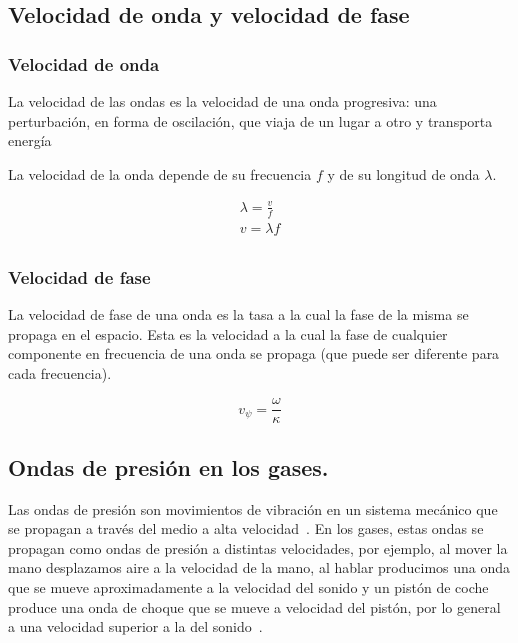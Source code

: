 \documentclass[twocolumn, 12pt]{article}
\begin{document}
\subsection{Velocidad de onda y velocidad de fase}

\subsubsection*{Velocidad de onda~\cite{Velocidaddeonda}}

La velocidad de las ondas es la velocidad de una onda
progresiva: una perturbación, en forma de oscilación, que
viaja de un lugar a otro y transporta energía

La velocidad de la onda depende de su frecuencia $f$ y de
su longitud de onda $\lambda$.

\begin{equation*}
    \begin{gathered}
        \lambda = \frac{v}{f}\\
        v = \lambda f \\
    \end{gathered}
\end{equation*}

\subsubsection*{Velocidad de fase~\cite{Velocidaddefase}}

La velocidad de fase de una onda es la tasa a la cual la
fase de la misma se propaga en el espacio. Esta es la
velocidad a la cual la fase de cualquier componente en
frecuencia de una onda se propaga (que puede ser diferente
para cada frecuencia).

    {\large
        \begin{equation*}
            v_{\psi} = \frac{\omega}{\kappa}
        \end{equation*}
    }

\subsection{Ondas de presión en los gases.}

Las ondas de presión son movimientos de vibración en un
sistema mecánico que se propagan a través del medio a alta
velocidad~\cite{ondasdepresion}. En los gases, estas ondas
se propagan como ondas de presión a distintas velocidades,
por ejemplo, al mover la mano desplazamos aire a la
velocidad de la mano, al hablar producimos una onda que se
mueve aproximadamente a la velocidad del sonido y un pistón
de coche produce una onda de choque que se mueve a
velocidad del pistón, por lo general a una velocidad
superior a la del sonido~\cite{Presiónengases}.
\end{document}
